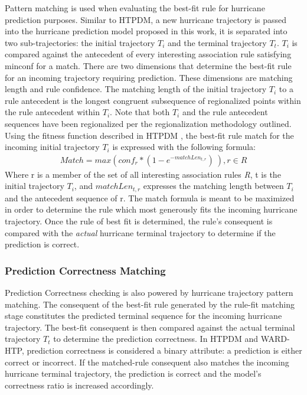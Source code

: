 \documentclass[12pt,conference]{IEEEtran}
\begin{document}
Pattern matching is used when evaluating the best-fit rule for hurricane prediction purposes. Similar to HTPDM, a new hurricane trajectory is passed into the hurricane prediction model proposed in this work, it is separated into two sub-trajectories: the initial trajectory $T_{i}$ and the terminal trajectory $T_{t}$. $T_{i}$ is compared against the antecedent of every interesting association rule satisfying minconf for a match. There are two dimensions that determine the best-fit rule for an incoming trajectory requiring prediction. These dimensions are matching length and rule confidence. The matching length of the initial trajectory $T_{i}$ to a rule antecedent is the longest congruent subsequence of regionalized points within the rule antecedent within $T_{i}$. Note that both $T_{i}$ and the rule antecedent sequences have been regionalized per the regionalization methodology outlined. Using the fitness function described in HTPDM \cite{major-hurricane-model}, the best-fit rule match for the incoming initial trajectory $T_{i}$ is expressed with the following formula:
\begin{eqnarray*}
Match = max( conf_{r} * (1 - e^{-matchLen_{t,r} } )\ ), r \in R
\end{eqnarray*}
Where r is a member of the set of all interesting association rules \textit{R}, t is the initial trajectory $T_{i}$, and $matchLen_{t,r}$ expresses the matching length between $T_{i}$ and the antecedent sequence of r. The match formula is meant to be maximized in order to determine the rule which most generously fits the incoming hurricane trajectory. Once the rule of best fit is determined, the rule's consequent is compared with the \textit{actual} hurricane terminal trajectory to determine if the prediction is correct.

\subsubsection{Prediction Correctness Matching}

Prediction Correctness checking is also powered by hurricane trajectory pattern matching. The consequent of the best-fit rule generated by the rule-fit matching stage constitutes the predicted terminal sequence for the incoming hurricane trajectory. The best-fit consequent is then compared against the actual terminal trajectory $T_{t}$ to determine the prediction correctness. In HTPDM and WARD-HTP, prediction correctness is considered a binary attribute: a prediction is either correct or incorrect. If the matched-rule consequent also matches the incoming hurricane terminal trajectory, the prediction is correct and the model's correctness ratio is increased accordingly.
\end{document}

